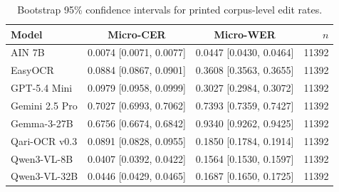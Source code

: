 \begin{table}[t]
\centering
\caption{Bootstrap 95\% confidence intervals for printed corpus-level edit rates.}
\label{tab:app_ci_printed_micro}
\small
\setlength{\tabcolsep}{3.5pt}
\begin{tabular}{lccr}
\toprule
Model & Micro-CER & Micro-WER & $n$ \\
\midrule
AIN 7B & 0.0074 [0.0071, 0.0077] & 0.0447 [0.0430, 0.0464] & 11392 \\
EasyOCR & 0.0884 [0.0867, 0.0901] & 0.3608 [0.3563, 0.3655] & 11392 \\
GPT-5.4 Mini & 0.0979 [0.0958, 0.0999] & 0.3027 [0.2984, 0.3072] & 11392 \\
Gemini 2.5 Pro & 0.7027 [0.6993, 0.7062] & 0.7393 [0.7359, 0.7427] & 11392 \\
Gemma-3-27B & 0.6756 [0.6674, 0.6842] & 0.9340 [0.9262, 0.9425] & 11392 \\
Qari-OCR v0.3 & 0.0891 [0.0828, 0.0955] & 0.1850 [0.1784, 0.1914] & 11392 \\
Qwen3-VL-8B & 0.0407 [0.0392, 0.0422] & 0.1564 [0.1530, 0.1597] & 11392 \\
Qwen3-VL-32B & 0.0446 [0.0429, 0.0465] & 0.1687 [0.1650, 0.1725] & 11392 \\
\bottomrule
\end{tabular}
\end{table}


